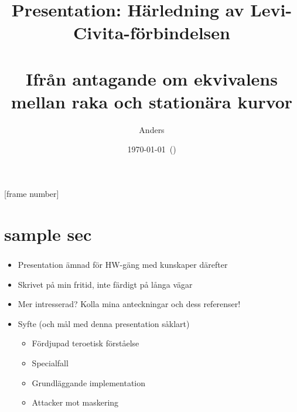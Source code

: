 \documentclass[aspectratio=169, beamer, oneside, leqno]{beamer}
\title{
  Presentation: Härledning av Levi-Civita-förbindelsen \\ %
  \\
  \large Ifrån antagande om ekvivalens mellan raka och stationära kurvor %
}
\author{Anders}
\date{\today\ (\currenttime)}
\begin{document}
\maketitle



[frame number]

\section{sample sec}

\begin{frame}
  \frametitle{\secname}
  \begin{itemize}[label=$\star$]
  \item Presentation ämnad för HW-gäng med kunskaper därefter
  \item Skrivet på min fritid, inte färdigt på långa vägar
  \item Mer intresserad? Kolla mina anteckningar och dess referenser!
  \item Syfte (och mål med denna presentation såklart)
    \begin{itemize}[label=$\wp$]
    \item Fördjupad teroetisk förståelse
    \item Specialfall
    \item Grundläggande implementation
    \item Attacker mot maskering
    \end{itemize}
  \end{itemize}
\end{frame}
\end{document}
